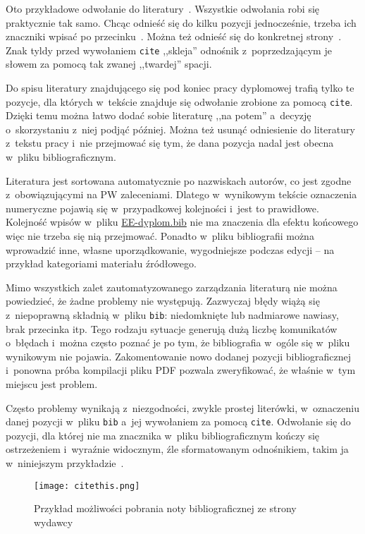 Oto przykładowe odwołanie do literatury~\cite{fowler2009}. Wszystkie odwołania robi się praktycznie tak samo. Chcąc odnieść się do kilku pozycji jednocześnie, trzeba ich znaczniki wpisać po przecinku~\cite{maxwell1865,leksinski1995}. Można też odnieść się do konkretnej strony~\cite[s.~38]{leksinski1995}. Znak tyldy przed wywołaniem \texttt{cite} ,,skleja'' odnośnik z~poprzedzającym je słowem za pomocą tak zwanej ,,twardej'' spacji.

Do spisu literatury znajdującego się pod koniec pracy dyplomowej trafią tylko te pozycje, dla których w~tekście znajduje się odwołanie zrobione za pomocą \texttt{cite}. Dzięki temu można łatwo dodać sobie literaturę ,,na potem'' a~decyzję o~skorzystaniu z~niej podjąć później. Można też usunąć odniesienie do literatury z~tekstu pracy i~nie przejmować się tym, że dana pozycja nadal jest obecna w~pliku bibliograficznym. 

Literatura jest sortowana automatycznie po nazwiskach autorów, co jest zgodne z~obowiązującymi na PW zaleceniami. Dlatego w~wynikowym tekście oznaczenia numeryczne pojawią się w~przypadkowej kolejności i~jest to prawidłowe. Kolejność wpisów w~pliku \href{./EE-dyplom.bib}{EE-dyplom.bib} nie ma znaczenia dla efektu końcowego więc nie trzeba się nią przejmować. Ponadto w~pliku bibliografii można wprowadzić inne, własne uporządkowanie, wygodniejsze podczas edycji -- na przykład kategoriami materiału źródłowego.

Mimo wszystkich zalet zautomatyzowanego zarządzania literaturą nie można powiedzieć, że żadne problemy nie występują. Zazwyczaj błędy wiążą się z~niepoprawną składnią w~pliku \texttt{bib}: niedomknięte lub nadmiarowe nawiasy, brak przecinka itp. Tego rodzaju sytuacje generują dużą liczbę komunikatów o~błędach i~można często poznać je po tym, że bibliografia w~ogóle się w~pliku wynikowym nie pojawia. Zakomentowanie nowo dodanej pozycji bibliograficznej i~ponowna próba kompilacji pliku PDF pozwala zweryfikować, że właśnie w~tym miejscu jest problem.

Często problemy wynikają z~niezgodności, zwykle prostej literówki, w~oznaczeniu danej pozycji w~pliku \texttt{bib} a~jej wywołaniem za pomocą \texttt{cite}. Odwołanie się do pozycji, dla której nie ma znacznika w~pliku bibliograficznym kończy się ostrzeżeniem i~wyraźnie widocznym, źle sformatowanym odnośnikiem, takim ja w~niniejszym przykładzie~\cite{tegoniema}.

\begin{figure}[t]
	\centering \texttt{[image: citethis.png]} %
	\caption{Przykład możliwości pobrania noty bibliograficznej ze strony wydawcy}
	\label{rys:citethis}
\end{figure}


